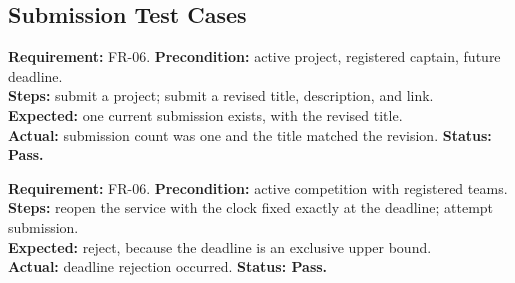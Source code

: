 \subsection{Submission Test Cases}
\begin{contentbox}
\textbf{Requirement:} FR-06. \textbf{Precondition:} active project, registered captain, future deadline.\\
\textbf{Steps:} submit a project; submit a revised title, description, and link.\\
\textbf{Expected:} one current submission exists, with the revised title.\\
\textbf{Actual:} submission count was one and the title matched the revision. \textbf{Status: Pass.}
\end{contentbox}
\begin{contentbox}
\textbf{Requirement:} FR-06. \textbf{Precondition:} active competition with registered teams.\\
\textbf{Steps:} reopen the service with the clock fixed exactly at the deadline; attempt submission.\\
\textbf{Expected:} reject, because the deadline is an exclusive upper bound.\\
\textbf{Actual:} deadline rejection occurred. \textbf{Status: Pass.}
\end{contentbox}
